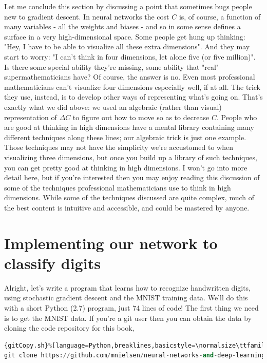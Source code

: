 \documentclass[a4paper,12pt]{report}%
\begin{document}
\bigskip

Let me conclude this section by discussing a point that sometimes bugs people new to gradient descent. In neural networks the cost $C$ is, of course, a function of many variables - all the weights and biases - and so in some sense defines a surface in a very high-dimensional space. Some people get hung up thinking: "Hey, I have to be able to visualize all these extra dimensions". And they may start to worry: "I can't think in four dimensions, let alone five (or five million)". Is there some special ability they're missing, some ability that "real" supermathematicians have? Of course, the answer is no. Even most professional mathematicians can't visualize four dimensions especially well, if at all. The trick they use, instead, is to develop other ways of representing what's going on. That's exactly what we did above: we used an algebraic (rather than visual) representation of $\Delta C$ to figure out how to move so as to decrease $C$. People who are good at thinking in high dimensions have a mental library containing many different techniques along these lines; our algebraic trick is just one example. Those techniques may not have the simplicity we're accustomed to when visualizing three dimensions, but once you build up a library of such techniques, you can get pretty good at thinking in high dimensions. I won't go into more detail here, but if you're interested then you may enjoy reading this discussion of some of the techniques professional mathematicians use to think in high dimensions. While some of the techniques discussed are quite complex, much of the best content is intuitive and accessible, and could be mastered by anyone.


\section{Implementing our network to classify digits}
Alright, let's write a program that learns how to recognize handwritten digits, using stochastic gradient descent and the MNIST training data. We'll do this with a short Python (2.7) program, just 74 lines of code! The first thing we need is to get the MNIST data. If you're a git user then you can obtain the data by cloning the code repository for this book,

\begin{lstlisting}[language=Python,breaklines,basicstyle=\footnotesize\ttfamily]{gitCopy.sh}%[language=Python,breaklines,basicstyle=\normalsize\ttfamily]%
git clone https://github.com/mnielsen/neural-networks-and-deep-learning.git
\end{lstlisting}
\end{document}
